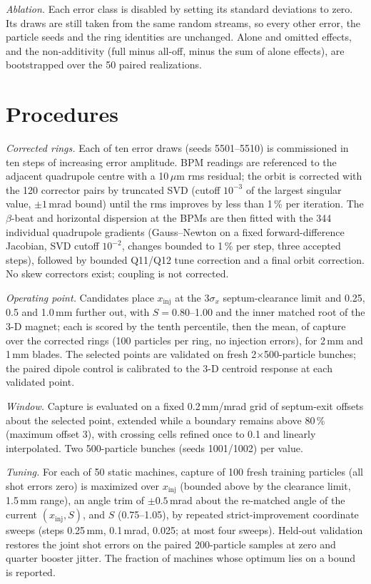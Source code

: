 \documentclass[aps,prab,preprint,amsmath,amssymb,floatfix,longbibliography]{revtex4-2}
\begin{document}
\emph{Ablation.} Each error class is disabled by setting its standard deviations to zero. Its draws are still taken
from the same random streams, so every other error, the particle seeds and the ring identities are unchanged. Alone
and omitted effects, and the non-additivity (full minus all-off, minus the sum of alone effects), are bootstrapped
over the 50 paired realizations.

\section{Procedures}
\label{sec:s-procedures}

\emph{Corrected rings.} Each of ten error draws (seeds 5501--5510) is commissioned in ten steps of increasing error
amplitude. BPM readings are referenced to the adjacent quadrupole centre with a 10\,$\mu$m rms residual; the orbit is
corrected with the 120 corrector pairs by truncated SVD (cutoff $10^{-3}$ of the largest singular value, $\pm1$\,mrad
bound) until the rms improves by less than 1\,\% per iteration. The $\beta$-beat and horizontal dispersion at the BPMs
are then fitted with the 344 individual quadrupole gradients (Gauss--Newton on a fixed forward-difference Jacobian,
SVD cutoff $10^{-2}$, changes bounded to 1\,\% per step, three accepted steps), followed by bounded Q11/Q12 tune
correction and a final orbit correction. No skew correctors exist; coupling is not corrected.

\emph{Operating point.} Candidates place $x_\mathrm{inj}$ at the 3$\sigma_x$ septum-clearance limit and 0.25, 0.5 and
1.0\,mm further out, with $S=0.80$--1.00 and the inner matched root of the 3-D magnet; each is scored by the tenth
percentile, then the mean, of capture over the corrected rings (100 particles per ring, no injection errors), for
2\,mm and 1\,mm blades. The selected points are validated on fresh 2$\times$500-particle bunches; the paired dipole
control is calibrated to the 3-D centroid response at each validated point.

\emph{Window.} Capture is evaluated on a fixed 0.2\,mm/mrad grid of septum-exit offsets about the selected point,
extended while a boundary remains above 80\,\% (maximum offset 3), with crossing cells refined once to 0.1 and linearly
interpolated. Two 500-particle bunches (seeds 1001/1002) per value.

\emph{Tuning.} For each of 50 static machines, capture of 100 fresh training particles (all shot errors zero) is
maximized over $x_\mathrm{inj}$ (bounded above by the clearance limit, 1.5\,mm range), an angle trim of
$\pm0.5$\,mrad about the re-matched angle of the current $(x_\mathrm{inj},S)$, and $S$ (0.75--1.05), by repeated
strict-improvement coordinate sweeps (steps 0.25\,mm, 0.1\,mrad, 0.025; at most four sweeps). Held-out validation
restores the joint shot errors on the paired 200-particle samples at zero and quarter booster jitter. The fraction of
machines whose optimum lies on a bound is reported.
\end{document}
